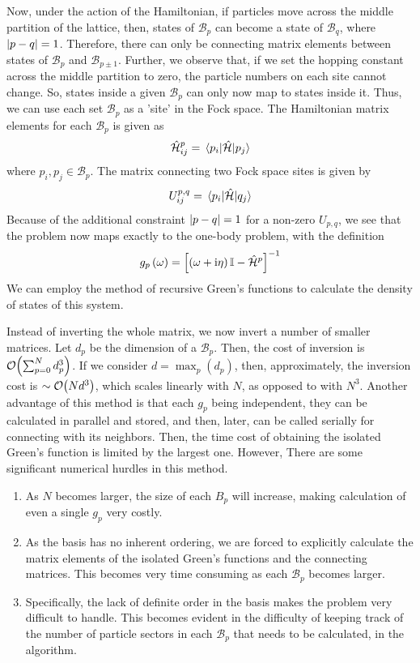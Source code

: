 	Now, under the action of the Hamiltonian, if particles move across the middle partition of the lattice, then, states of $ \mathcal{B}_p $ can become a state of $ \mathcal{B}_{q} $, where $ \abs{p-q} = 1 $. Therefore, there can only be connecting matrix elements between states of $ \mathcal{B}_p $ and $ \mathcal{B}_{p \pm 1} $. Further, we observe that, if we set the hopping constant across the middle partition to zero, the particle numbers on each site cannot change. So, states inside a given $ \mathcal{B}_p $ can only now map to states inside it. Thus, we can use each set $ \mathcal{B}_p $ as a 'site' in the Fock space. The Hamiltonian matrix elements for each $ \mathcal{B}_p $ is given as
	\begin{align}
		{\hat{\mathcal{H}}^{p}}_{ij} = \mel{p_i}{\hat{\mathcal{H}}}{p_j}
	\end{align}
	where $ p_i, p_j \in \mathcal{B}_p$. The matrix connecting two Fock space sites is given by \begin{align}
		U^{p,q}_{ij} = \mel{p_i}{\hat{\mathcal{H}}}{q_j}
	\end{align}
	Because of the additional constraint $ \abs{p-q} = 1 $ for a non-zero $ U_{p,q} $, we see that the problem now maps exactly to the one-body problem, with the definition
	\begin{align}
		g_p\left(\omega\right) = \left[ \left( \omega + \mathrm{i} \eta\right) \mathbb{I} - \hat{\mathcal{H}}^{p} \right]^{-1} 
	\end{align}
	We can employ the method of recursive Green's functions to calculate the density of states of this system.
	
	Instead of inverting the whole matrix, we now invert a number of smaller matrices.
	Let $ d_p $ be the dimension of a $ \mathcal{B}_p $. Then, the cost of inversion is $ \order{\sum_{p=0}^{N} d^{3}_p} $. If we consider $ d = \max_p \left( d_p \right)  $, then, approximately, the inversion cost is $ \sim \order{N d^3} $, which scales linearly with $ N $, as opposed to with $ N^3 $. Another advantage of this method is that each $ g_p $ being independent, they can be calculated in parallel and stored, and then, later, can be called serially for connecting with its neighbors. Then, the time cost of obtaining the isolated Green's function is limited by the largest one. However, There are some significant numerical hurdles in this method.
	\begin{enumerate}
		\item As $ N $ becomes larger, the size of each $ B_p $ will increase, making calculation of even a single $ g_p $ very costly.
		\item As the basis has no inherent ordering, we are forced to explicitly calculate the matrix elements of the isolated Green's functions and the connecting matrices. This becomes very time consuming as each $ \mathcal{B}_p $ becomes larger.
		\item 	Specifically, the lack of definite order in the basis makes the problem very difficult to handle. This becomes evident in the difficulty of keeping track of the number of particle sectors in each $ \mathcal{B}_p $ that needs to be calculated, in the algorithm.
	\end{enumerate}

	
	
	
	
	
	
	